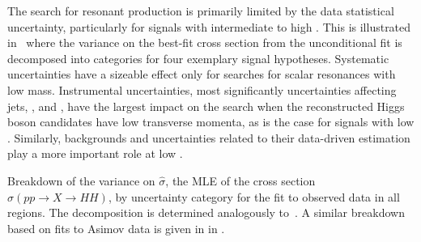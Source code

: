 The search for resonant \HH production is primarily limited by the data
statistical uncertainty, particularly for signals with intermediate to high
\mX. This is illustrated in~ where the variance on the
best-fit cross section from the unconditional fit
is decomposed into categories for four exemplary signal hypotheses. Systematic
uncertainties have a sizeable effect
only for searches for scalar resonances with low mass. Instrumental
uncertainties, most significantly uncertainties affecting jets, \pTmissAbs, and
\tauhadvis, have the largest impact on the search when the reconstructed Higgs
boson candidates have low transverse momenta, as is the case for signals with
low \mX. Similarly, \faketauhadvis backgrounds and uncertainties related to
their data-driven estimation
play a more important role at low \mX.

\begin{table}[htbp]
  \centering

  \caption{Breakdown of the variance on $\hat{\sigma}$, the MLE of the cross
    section $\sigma(pp \to X\to HH)$, by uncertainty category for the fit to
    observed data in all regions. The decomposition is determined analogously
    to~. A similar breakdown based on fits to Asimov
    data is given in  in
    .}%
  \label{tab:breakdown_res}

  

\end{table}


